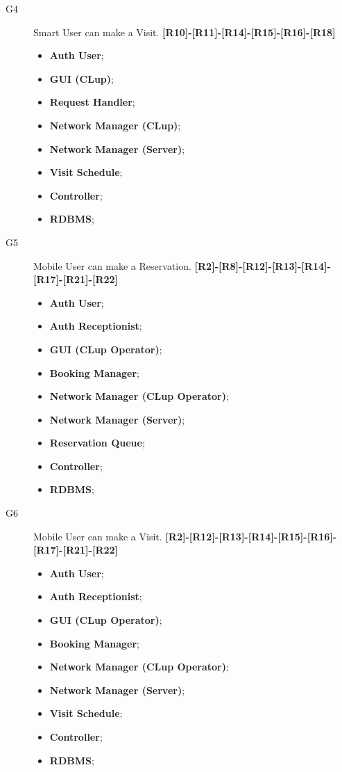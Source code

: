 \begin{description}
    
    \item[G4]Smart User can make a Visit. \textbf{[R10]-[R11]-[R14]-[R15]-[R16]-[R18]}
    \begin{itemize}
        \item \textbf{Auth User};  
        \item \textbf{GUI (CLup)};  
        \item \textbf{Request Handler}; 
        \item \textbf{Network Manager (CLup)}; 
        \item \textbf{Network Manager (Server)};  
        \item \textbf{Visit Schedule};  
        \item \textbf{Controller};
        \item \textbf{RDBMS};
    \end{itemize}
    
    \item[G5]Mobile User can make a Reservation. \textbf{[R2]-[R8]-[R12]-[R13]-[R14]-[R17]-[R21]-[R22]}
    \begin{itemize}
        \item \textbf{Auth User}; 
        \item \textbf{Auth Receptionist};  
        \item \textbf{GUI (CLup Operator)};  
        \item \textbf{Booking Manager}; 
        \item \textbf{Network Manager (CLup Operator)}; 
        \item \textbf{Network Manager (Server)};  
        \item \textbf{Reservation Queue};  
        \item \textbf{Controller};
        \item \textbf{RDBMS};
    \end{itemize}
    
    \item[G6]Mobile User can make a Visit. \textbf{[R2]-[R12]-[R13]-[R14]-[R15]-[R16]-[R17]-[R21]-[R22]}
     \begin{itemize}
        \item \textbf{Auth User}; 
        \item \textbf{Auth Receptionist};  
        \item \textbf{GUI (CLup Operator)};  
        \item \textbf{Booking Manager}; 
        \item \textbf{Network Manager (CLup Operator)}; 
        \item \textbf{Network Manager (Server)};  
        \item \textbf{Visit Schedule};  
        \item \textbf{Controller};
        \item \textbf{RDBMS};
    \end{itemize}
    

\end{description}
